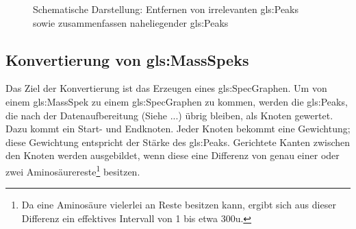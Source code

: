 \documentclass[a4paper, 12pt]{article}
\newcommand{\tikzScale}{1.15}
\begin{document}
\begin{figure}[htb]
\begin{minipage}[t]{.4\linewidth}
   \end{minipage}
   \caption*{Schematische Darstellung: Entfernen von irrelevanten \glspl{gls:Peak} sowie zusammenfassen naheliegender \glspl{gls:Peak}}
\end{figure}

\subsection{Konvertierung von \glspl{gls:MassSpek}}
Das Ziel der Konvertierung ist das Erzeugen eines \gls{gls:SpecGraph}en. Um von einem \gls{gls:MassSpek} zu einem \gls{gls:SpecGraph}en zu kommen, werden die \glspl{gls:Peak}, die nach der Datenaufbereitung (Siehe ...) übrig bleiben, als Knoten gewertet. Dazu kommt ein Start- und Endknoten. Jeder Knoten bekommt eine Gewichtung; diese Gewichtung entspricht der Stärke des \gls{gls:Peak}s.
Gerichtete Kanten zwischen den Knoten werden ausgebildet, wenn diese eine Differenz von genau einer oder zwei Aminosäurereste\footnote{Da eine Aminosäure vielerlei an Reste besitzen kann, ergibt sich aus dieser Differenz ein effektives Intervall von 1 bis etwa 300u.} besitzen.

\newcommand{\colorA}{white!30!green}
\newcommand{\colorB}{black!10!yellow}
\newcommand{\colorC}{white!40!red}
\newcommand{\colorD}{white!25!orange}
\newcommand{\colorE}{white!45!blue}
\newcommand{\colorF}{white!5!magenta}
\end{document}

